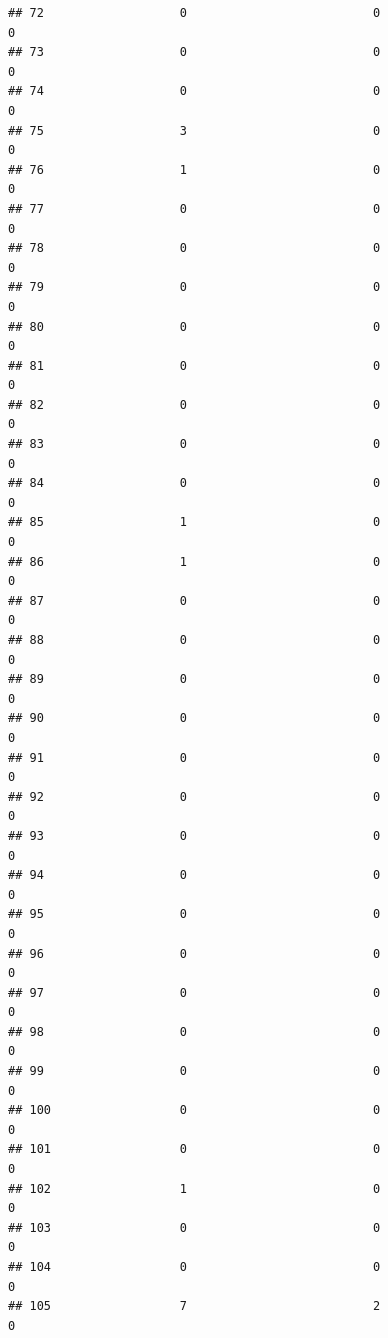 \documentclass[
]{article}
\begin{document}
\begin{verbatim}
## 72                   0                          0                       0
## 73                   0                          0                       0
## 74                   0                          0                       0
## 75                   3                          0                       0
## 76                   1                          0                       0
## 77                   0                          0                       0
## 78                   0                          0                       0
## 79                   0                          0                       0
## 80                   0                          0                       0
## 81                   0                          0                       0
## 82                   0                          0                       0
## 83                   0                          0                       0
## 84                   0                          0                       0
## 85                   1                          0                       0
## 86                   1                          0                       0
## 87                   0                          0                       0
## 88                   0                          0                       0
## 89                   0                          0                       0
## 90                   0                          0                       0
## 91                   0                          0                       0
## 92                   0                          0                       0
## 93                   0                          0                       0
## 94                   0                          0                       0
## 95                   0                          0                       0
## 96                   0                          0                       0
## 97                   0                          0                       0
## 98                   0                          0                       0
## 99                   0                          0                       0
## 100                  0                          0                       0
## 101                  0                          0                       0
## 102                  1                          0                       0
## 103                  0                          0                       0
## 104                  0                          0                       0
## 105                  7                          2                       0

\end{verbatim}
\end{document}
